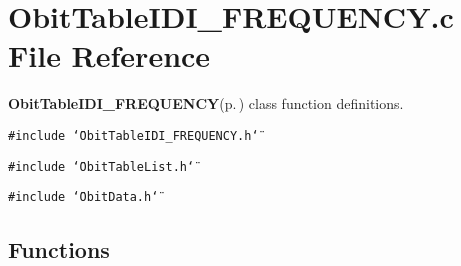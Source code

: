 \section{Obit\-Table\-IDI\_\-FREQUENCY.c File Reference}
\label{ObitTableIDI__FREQUENCY_8c}
{\bf Obit\-Table\-IDI\_\-FREQUENCY}{\rm (p.\,\pageref{structObitTableIDI__FREQUENCY})} class function definitions. 

{\tt \#include \char`\"{}Obit\-Table\-IDI\_\-FREQUENCY.h\char`\"{}}\par
{\tt \#include \char`\"{}Obit\-Table\-List.h\char`\"{}}\par
{\tt \#include \char`\"{}Obit\-Data.h\char`\"{}}\par
\subsection*{Functions}
